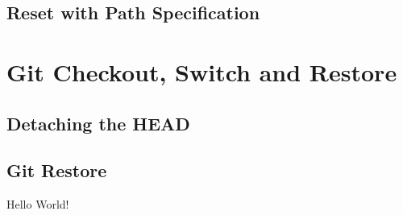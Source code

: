 \subsection{Reset with Path Specification}
\label{chapter:2.2.2}

\section{Git Checkout, Switch and Restore}
\label{chapter:2.3}

\subsection{Detaching the HEAD}
\label{chapter:2.3.1}

\subsection{Git Restore}
\label{chapter:2.3.2}

Hello World!


